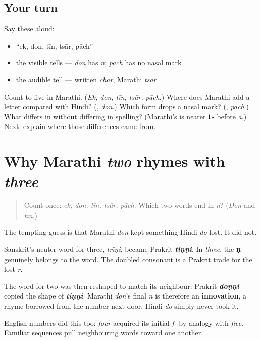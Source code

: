 \subsection*{Your turn}
Say these aloud:

\begin{itemize}
\raggedright
  \item \textquotedblleft{}ek, don, tīn, tsār, pāch\textquotedblright{}
  \item the visible tells — \emph{don} has \emph{n}; \emph{pāch} has no nasal mark
  \item the audible tell — written \emph{chār}, Marathi \emph{tsār}
\end{itemize}

\begin{tcolorbox}[breakable,colback=teal!4,colframe=teal!35!black,title={Before you move on}]
Count to five in Marathi. (\emph{Ek, don, tīn, tsār, pāch}.) Where does Marathi add a letter compared with Hindi? (\textbf{}, \emph{don}.) Which form drops a nasal mark? (\textbf{}, \emph{pāch}.) What differs in \textbf{} without differing in spelling? (Marathi's \textbf{} is nearer \textbf{ts} before \emph{ā}.) Next: explain where those differences came from.
\end{tcolorbox}
\section[don · tīn · pāch · chār]{Why Marathi \emph{two} rhymes with \emph{three}}

\label{lesson:MR-C06-number-differences}



\begin{quote}
Count once: \emph{ek, don, tīn, tsār, pāch}. Which two words end in \emph{n}? (\emph{Don} and \emph{tīn}.)
\end{quote}

\begin{cousinweb}
The tempting guess is that Marathi \textbf{} \emph{don} kept something Hindi \textbf{} \emph{do} lost. It did not.

Sanskrit's neuter word for three, \textbf{} \emph{tr\'{\={\i}}ṇi}, became Prakrit \emph{\textbf{tiṇṇi}}. In \emph{three}, the \textbf{ṇ} genuinely belongs to the word. The doubled consonant is a Prakrit trade for the lost \emph{r}.

The word for two was then reshaped to match its neighbour: Prakrit \emph{\textbf{doṇṇi}} copied the shape of \emph{\textbf{tiṇṇi}}. Marathi \emph{don}'s final \emph{n} is therefore an \textbf{innovation}, a rhyme borrowed from the number next door. Hindi \emph{do} simply never took it.

English numbers did this too: \emph{four} acquired its initial \emph{f-} by analogy with \emph{five}. Familiar sequences pull neighbouring words toward one another.
\end{cousinweb}

